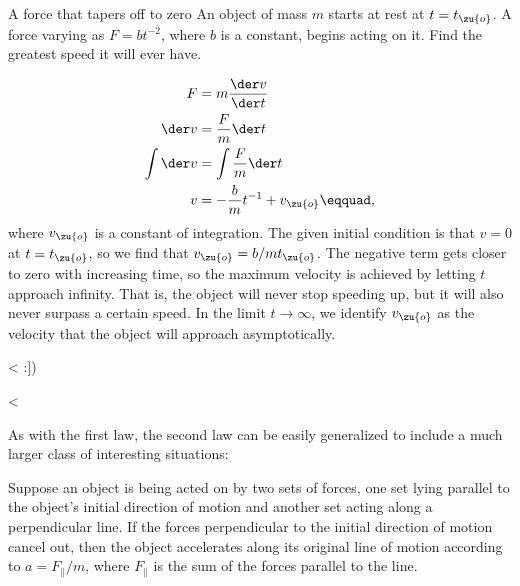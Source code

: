 \begin{eg}{A force that tapers off to zero}
\egquestion An object of mass $m$ starts at rest at $t=t_\zu{o}$. 
A force varying as $F=bt^{-2}$,
where $b$ is a constant, begins acting on it. Find the greatest speed it will
ever have.

\eganswer
\begin{align*}
F &= m\frac{\der v}{\der t} \\
\der v &= \frac{F}{m} \der t \\
\int \der v &= \int \frac{F}{m} \der t\\
v  &= -\frac{b}{m}t^{-1}+v_\zu{o}\eqquad,
\end{align*}
where $v_\zu{o}$ is a constant of integration.
The given initial condition is that $v=0$ at $t=t_\zu{o}$, so we find that $v_\zu{o}=b/mt_\zu{o}$. The negative term gets closer
to zero with increasing time, so the maximum velocity is achieved by letting $t$ approach infinity. That is, the
object will never stop speeding up, but it will also never surpass a certain speed. In the limit $t\rightarrow\infty$,
we identify $v_\zu{o}$ as the velocity that the object will approach asymptotically.
\end{eg}

<%
:])

<%

As with the first law, the second law can be easily
generalized to include a much larger class of interesting situations:\label{generalization-of-second-law}

\begin{lessimportant}
Suppose an object is being acted on by two sets of forces,
one set lying parallel to the object's initial direction of motion
and another set acting along a perpendicular line. If the
forces perpendicular to the initial direction of motion
cancel out, then the object accelerates along its original
line of motion according to $a=F_\parallel/m$,
where $F_\parallel$ is the sum of the forces parallel to the line.
\end{lessimportant}

